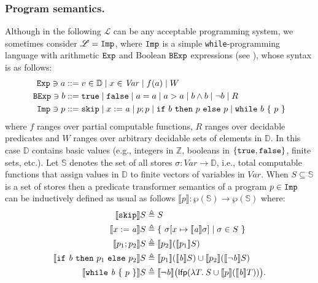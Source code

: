 \documentclass[runningheads]{llncs}
\def\Imp{\tt Imp}
\def\Comm{C}
\def\Aexp{\mathit{a}}
\def\Bexp{\mathit{b}}
\def\PBexp{\it t}
\def\grasse#1{{\llbracket #1 \rrbracket}}
\newcommand{\ccL}{\mathscr{L}}
\newcommand{\scl}{\mathbb{S}}
\newcommand{\Domain}{\mathbb{D}}
\newcommand{\Var}{\ensuremath{\mathit{Var}}}
\newcommand{\ra}{\rightarrow}
\def\defi{\triangleq}
\newcommand{\integer}{\mathbb{Z}}
\def\lfp{{\sf lfp\/}}
\begin{document}
\subsubsection{Program semantics.}
Although in the following $\ccL$ can be any acceptable programming system, we sometimes consider $\ccL=\Imp$, where $\Imp$ is a simple {\tt while}-programming language with arithmetic ${\tt Exp}$ and Boolean ${\tt BExp}$ expressions (see \cite{winskel}), whose syntax is as follows: 
%
  \begin{align*}
   {\tt Exp} \ni a  ::= &\; v\in\Domain\mid x\in \Var\mid  f(a)\mid W \\
   {\tt BExp} \ni b ::= &\; {\tt true}\mid {\tt false} \mid a =a \mid a > a\mid b\wedge b\mid\neg b\mid R\\
    {\Imp}\ni p ::= &\;{\tt skip}\mid x:=\Aexp\mid p;p\mid 
    {\tt if} ~b~ {\tt then} ~p~ {\tt else} ~p \mid 
    {\tt while} ~b~ \{ ~p~\}
   \end{align*}
where $f$ ranges over partial computable functions, $R$ ranges over decidable predicates and
$W$ ranges over arbitrary decidable sets of elements in $\Domain$. 
In this case $\Domain$ contains basic values (e.g., integers in $\integer$, booleans in $\{{\tt true, false}\}$, finite sets, etc.). Let $\scl$ denotes the set of all stores $\sigma:\Var\ra\Domain$, i.e., total computable functions that assign values in $\Domain$ to finite vectors of variables in $\Var$. When $S\subseteq\scl$ is a set of stores then a predicate transformer semantics of a program $p\in\Imp$ can be inductively defined as usual as follows $\grasse{p}: \wp(\scl)\ra \wp(\scl)$ where:
\begin{align*}
\grasse{{\tt skip}}S &\defi S\\
\grasse{x:=\Aexp}S &\defi \{\ \sigma[x\mapsto \grasse{\Aexp}\sigma] \mid \sigma \in S\ \}\\
\grasse{p_1 ; p_2 } S &\defi \grasse{p_2}(\grasse{p_1}S)\\
\grasse{{\tt if}\ \Bexp\ {\tt then}\ p_1\ {\tt else}\ p_2}S &\defi  \grasse{p_1}(\grasse{\Bexp}S) \cup \grasse{p_2}(\grasse{\neg\Bexp}S)\\
\grasse{{\tt while}\ \Bexp\  \{\ p\ \} }S &\defi \grasse{\neg \Bexp}\big(\lfp (\lambda T.\: S \cup \grasse{p}(\grasse{\Bexp}T))\big).
\end{align*}
\end{document}
